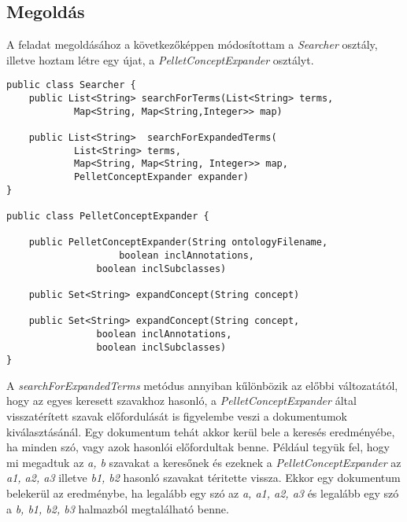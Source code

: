 \subsection{Megoldás}
A feladat megoldásához a következőképpen módosítottam a \emph{Searcher} osztály, illetve hoztam létre egy újat, a \emph{PelletConceptExpander} osztályt.

\begin{lstlisting}[frame=single,float=!ht]
public class Searcher {
	public List<String> searchForTerms(List<String> terms,
			Map<String, Map<String,Integer>> map)

	public List<String>  searchForExpandedTerms(
			List<String> terms, 
			Map<String, Map<String, Integer>> map, 
			PelletConceptExpander expander)
}

public class PelletConceptExpander {

	public PelletConceptExpander(String ontologyFilename, 
      				boolean inclAnnotations, 
				boolean inclSubclasses) 	

	public Set<String> expandConcept(String concept)
	
	public Set<String> expandConcept(String concept, 
				boolean inclAnnotations, 
				boolean inclSubclasses)
}
\end{lstlisting}

A \emph{searchForExpandedTerms} metódus annyiban kűlönbözik az előbbi változatától, hogy az egyes keresett szavakhoz hasonló, a \emph{PelletConceptExpander} által visszatérített szavak előfordulását is figyelembe veszi a dokumentumok kiválasztásánál. Egy dokumentum tehát akkor kerül bele a keresés eredményébe, ha minden szó, vagy azok hasonlói előfordultak benne. Például tegyük fel, hogy mi megadtuk az \emph{a, b} szavakat a keresőnek és ezeknek a \emph{PelletConceptExpander} az \emph{a1, a2, a3} illetve \emph{b1, b2} hasonló szavakat téritette vissza. Ekkor egy dokumentum belekerül az eredménybe, ha legalább egy szó az \emph{a, a1, a2, a3} és legalább egy szó a \emph{b, b1, b2, b3} halmazból megtalálható benne.

